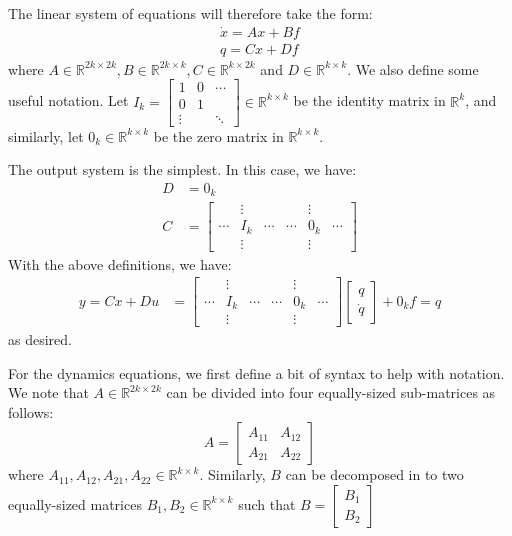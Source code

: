 \documentclass[12pt]{exam}
\begin{document}
\begin{questions}
\begin{solution}
The linear system of equations will therefore take the form:
\begin{align*}
  \dot{x} = Ax + Bf\\
  q = Cx + Df
\end{align*}
where $A \in \mathbb{R}^{2k \times 2k}, B \in \mathbb{R}^{2k \times k}, C \in \mathbb{R}^{k \times 2k}$ and $D \in \mathbb{R}^{k \times k}$. We also define some useful notation. Let $I_k =
  \begin{bmatrix}
    1 & 0 & \cdots  \\
    0 & 1 & \\
    \vdots &  & \ddots 
  \end{bmatrix}
\in \mathbb{R}^{k \times k}$ be the identity matrix in $\mathbb{R}^k$, and similarly, let $0_k \in \mathbb{R}^{k \times k}$ be the zero matrix in $\mathbb{R}^{k \times k}$.

The output system is the simplest. In this case, we have:
\begin{align*}
  D &= 0_k \\
  C &=
    \begin{bmatrix}
      & \vdots &  & & \vdots &\\
      \cdots & I_k & \cdots & \cdots & 0_k &  \cdots \\
       & \vdots &  & &  \vdots &
    \end{bmatrix}
  \tag{The first $k \times k$ section forms the identity matrix, and the second $k \times k$ section is all zero}
\end{align*}
With the above definitions, we have:
\begin{align*}
  y = Cx + Du &= \begin{bmatrix}
      & \vdots &  & & \vdots &\\
      \cdots & I_k & \cdots & \cdots & 0_k &  \cdots \\
       & \vdots &  & &  \vdots &
    \end{bmatrix}\begin{bmatrix} q \\ \dot{q}  \end{bmatrix} + 0_k f = q
\end{align*}
as desired.

For the dynamics equations, we first define a bit of syntax to help with notation. We note that $A \in \mathbb{R}^{2k \times 2k}$ can be divided into four equally-sized sub-matrices as follows:
$$
  A =
    \begin{bmatrix}
      A_{11} & A_{12} \\
      A_{21} & A_{22}
    \end{bmatrix}
$$
where $A_{11}, A_{12}, A_{21}, A_{22} \in \mathbb{R}^{k \times k}$. Similarly, $B$ can be decomposed in to two equally-sized matrices $B_1, B_2 \in \mathbb{R}^{k \times k}$ such that $B =
  \begin{bmatrix}
    B_1 \\
    B_2
  \end{bmatrix}$


\end{solution}
\end{questions}
\end{document}

